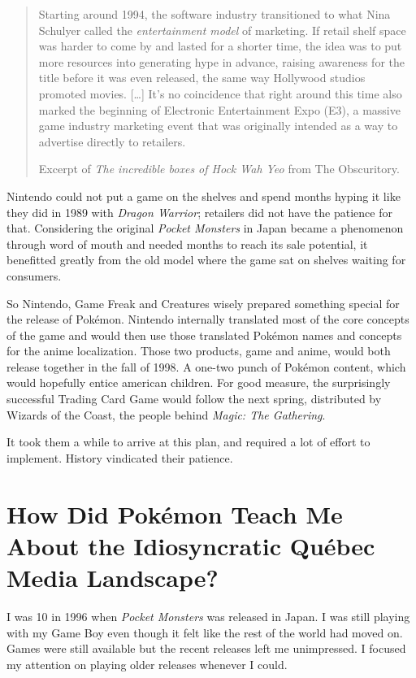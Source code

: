 \documentclass{book}
\begin{document}
\begin{quote}
Starting around 1994, the software industry transitioned to what Nina Schulyer called the \emph{entertainment model} of marketing. If retail shelf space was harder to come by and lasted for a shorter time, the idea was to put more resources into generating hype in advance, raising awareness for the title before it was even released, the same way Hollywood studios promoted movies. […] It’s no coincidence that right around this time also marked the beginning of Electronic Entertainment Expo (E3), a massive game industry marketing event that was originally intended as a way to advertise directly to retailers.

Excerpt of \emph{The incredible boxes of Hock Wah Yeo} from The Obscuritory.
\end{quote} \par

Nintendo could not put a game on the shelves and spend months hyping it like they did in 1989 with \emph{Dragon Warrior}; retailers did not have the patience for that. Considering the original \emph{Pocket Monsters} in Japan became a phenomenon through word of mouth and needed months to reach its sale potential, it benefitted greatly from the old model where the game sat on shelves waiting for consumers.

So Nintendo, Game Freak and Creatures wisely prepared something special for the release of Pokémon. Nintendo internally translated most of the core concepts of the game and would then use those translated Pokémon names and concepts for the anime localization. Those two products, game and anime, would both release together in the fall of 1998. A one-two punch of Pokémon content, which would hopefully entice american children. For good measure, the surprisingly successful Trading Card Game would follow the next spring, distributed by Wizards of the Coast, the people behind \emph{Magic: The Gathering}.

It took them a while to arrive at this plan, and required a lot of effort to implement. History vindicated their patience.

\FloatBarrier\needspace{10mm}\section*{How Did Pokémon Teach Me About the Idiosyncratic Québec Media Landscape?}\nopagebreak[4]

I was 10 in 1996 when \emph{Pocket Monsters} was released in Japan. I was still playing with my Game Boy even though it felt like the rest of the world had moved on. Games were still available but the recent releases left me unimpressed. I focused my attention on playing older releases whenever I could.
\end{document}
